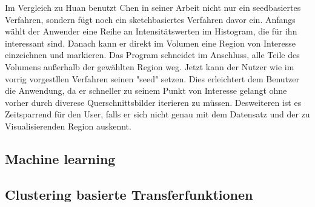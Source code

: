 Im Vergleich zu Huan \cite{huang2003rgvis} benutzt Chen  in seiner Arbeit \cite{chen2006sketch} nicht nur ein seedbasiertes Verfahren, sondern fügt noch ein sketchbasiertes Verfahren davor ein.
\newline
Anfangs wählt der Anwender eine Reihe an Intensitätswerten im Histogram, die für ihn interessant sind. Danach kann er direkt im Volumen eine Region von Interesse einzeichnen und markieren. Das Program schneidet im Anschluss, alle Teile des Volumens außerhalb der gewählten Region weg. Jetzt kann der Nutzer wie im vorrig vorgestllen Verfahren seinen "seed" setzen.
\newline
Dies erleichtert dem Benutzer die Anwendung, da er schneller zu seinem Punkt von Interesse gelangt ohne vorher durch diverese Querschnittsbilder iterieren zu müssen. Desweiteren ist es Zeitsparrend für den User, falls er sich nicht genau mit dem Datensatz und der zu Visualisierenden Region auskennt.


\subsection{Machine learning}
\subsection{Clustering basierte Transferfunktionen}

